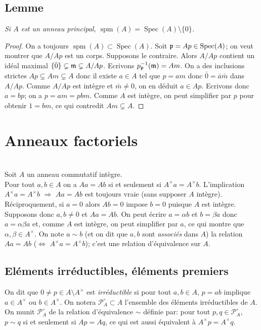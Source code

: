\documentclass[a4paper, oneside, 12pt]{book}
\theoremstyle{theoremeStyle} %
\theoremstyle{definition} %
\DeclareMathOperator{\Spec}{Spec}
\DeclareMathOperator{\spm}{spm}
\begin{document}
  \section{Lemme}\textit{Si $A$ est un anneau principal, $\spm(A)=\Spec(A)\setminus \lbrace 0\rbrace$.}

  \begin{proof} On a toujours $\spm(A)\subset \Spec(A)$. Soit $\frak{p}=Ap\in \Spec(A)$; on veut montrer que $A/Ap$ est un corps. Supposons le contraire. Alors $A/Ap$ contient un idéal maximal $\lbrace \bar{0}\rbrace\subsetneq\frak{m}\subsetneq A/Ap$. Ecrivons $p_{\frak{p}}^{-1}(\frak{m})=Am$. On a des inclusions strictes  $Ap\subsetneq Am\subsetneq A$ donc il existe $a\in A$ tel que $p=am$ donc $\bar{0}=\bar{a}\bar{m}$ dans $A/Ap$. Comme $A/Ap$ est intègre et $\bar{m}\not= 0$, on en déduit $a\in Ap$. Ecrivons donc $a=bp$; on a $p=am=pbm$. Comme $A$ est intègre, on peut simplifier par $p$ pour obtenir $1=bm$, ce qui contredit $ Am\subsetneq A$.   \end{proof}
 \chapter{Anneaux factoriels}\label{Factoriel} \textit{}\\
  Soit $A$ un anneau commutatif intègre. \\

  Pour tout $a,b\in A$ on a $Aa=Ab$ si et seulement si $A^\times a=A^\times b$. L'implication $A^\times a=A^\times b$ $\Rightarrow$ $Aa=Ab$ est toujours vraie (sans supposer $A$ intègre). Réciproquement,   si $a=0$ alors $Ab=0$ impose $b=0$ puisque $A$ est intègre. Supposons donc $a,b\not= 0$ et $Aa=Ab$. On peut écrire $a=\alpha b$ et $b=\beta a$ donc $a=\alpha\beta a$ et, comme $A$ est intègre, on peut simplifier par $a$, ce qui montre que $\alpha,\beta\in A^\times$. On note $a\sim b$ (et on dit que $a,b$ sont \textit{associés} dans $A$) la relation $Aa=Ab$ ($\Leftrightarrow$ $A^\times a=A^\times b$); c'est une relation d'équivalence sur $A$.




\section{Eléments irréductibles, éléments premiers}\label{IrrPrem}On dit que $0\not=p\in A\setminus A^\times$  est \textit{irréductible} si pour tout $a,b\in A$, $p=ab$ implique $a\in A^\times$ ou $b\in A^\times$. On notera $\mathcal{P}_A^\circ\subset A$ l'ensemble des éléments irréductibles de $A$.
  On munit  $\mathcal{P}_A^\circ$ de la relation d'équivalence $\sim$ définie par: pour tout $p,q\in \mathcal{P}_A^\circ$, $p\sim q$ si et seulement si $Ap=Aq$, ce qui est aussi équivalent à  $A^\times p=A^\times q$.\\
\end{document}
